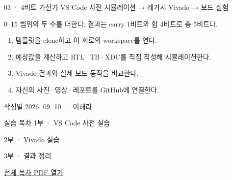 
\renewcommand{\labonehome}{\hyperlink{legacy-03-contents}{\contentsbutton}}
\renewcommand{\legacySource}[1]{}
\providecommand{\terminalbox}[1]{\par\vspace{0.15cm}{\setlength{\fboxsep}{7pt}\colorbox{black}{\parbox{\dimexpr\textwidth-14pt\relax}{\color{white}\ttfamily\fontsize{7}{9}\selectfont #1}}}\par\vspace{0.15cm}}

\begingroup
\renewcommand{\small}{\fontsize{9}{11}\selectfont}
\begin{frame}{03 · 4비트 가산기}\relax
\small
VS Code 사전 시뮬레이션 → 레거시 Vivado → 보드 실험\par\vspace{0.22cm}0–15 범위의 두 수를 더한다. 결과는 carry 1비트와 합 4비트로 총 5비트다.\par\begin{enumerate}\setlength{\itemsep}{0.22cm}
\item 템플릿을 clone하고 이 회로의 workspace를 연다.
\item 예상값을 계산하고 RTL·TB·XDC를 직접 작성해 시뮬레이션한다.
\item Vivado 결과와 실제 보드 동작을 비교한다.
\item 자신의 사진·영상·레포트를 GitHub에 연결한다.
\end{enumerate}
작성일 2026. 09. 10. · 이해리\par
\end{frame}

\begin{frame}[label=legacy-03-contents]{실습 목차}\relax
\small
1부 · VS Code 사전 실습\par{}\par\vspace{0.2cm}
\par\vspace{0.4cm}
2부 · Vivado 실습\par{}\par\vspace{0.4cm}
3부 · 결과 정리\par{}\par\vspace{0.35cm}
\href{04.LAB1_00_CONTENTS.pdf}{전체 목차 PDF 열기}
\end{frame}

